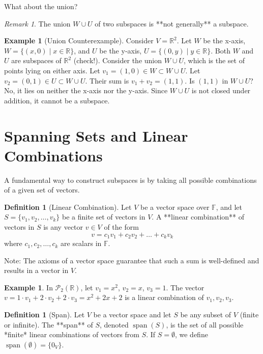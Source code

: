 \documentclass[11pt]{article}
\theoremstyle{definition}
\newtheorem{definition}[theorem]{Definition}
\newtheorem{example}[theorem]{Example}
\theoremstyle{remark}
\newtheorem{remark}[theorem]{Remark}
\newcommand{\R}{\mathbb{R}}
\newcommand{\F}{\mathbb{F}} %
\newcommand{\PolyN}[2]{\mathcal{P}_{#1}(#2)}
\DeclareMathOperator{\Span}{span}
\begin{document}
What about the union?
\begin{remark}
The union $W \cup U$ of two subspaces is **not generally** a subspace.
\end{remark}

\begin{example}[Union Counterexample]
Consider $V = \R^2$. Let $W$ be the x-axis, $W = \{(x, 0) \mid x \in \R\}$, and $U$ be the y-axis, $U = \{(0, y) \mid y \in \R\}$. Both $W$ and $U$ are subspaces of $\R^2$ (check!).
Consider the union $W \cup U$, which is the set of points lying on either axis.
Let $v_1 = (1, 0) \in W \subset W \cup U$.
Let $v_2 = (0, 1) \in U \subset W \cup U$.
Their sum is $v_1 + v_2 = (1, 1)$.
Is $(1, 1)$ in $W \cup U$? No, it lies on neither the x-axis nor the y-axis.
Since $W \cup U$ is not closed under addition, it cannot be a subspace.
\end{example}

\section{Spanning Sets and Linear Combinations}

A fundamental way to construct subspaces is by taking all possible combinations of a given set of vectors.

\begin{definition}[Linear Combination]
Let $V$ be a vector space over $\F$, and let $S = \{v_1, v_2, \dots, v_k\}$ be a finite set of vectors in $V$. A **linear combination** of vectors in $S$ is any vector $v \in V$ of the form
\[ v = c_1 v_1 + c_2 v_2 + \dots + c_k v_k \]
where $c_1, c_2, \dots, c_k$ are scalars in $\F$.
\end{definition}
Note: The axioms of a vector space guarantee that such a sum is well-defined and results in a vector in $V$.

\begin{example}
In $\PolyN{2}{\R}$, let $v_1 = x^2$, $v_2 = x$, $v_3 = 1$. The vector $v = 1 \cdot v_1 + 2 \cdot v_2 + 2 \cdot v_3 = x^2 + 2x + 2$ is a linear combination of $v_1, v_2, v_3$.
\end{example}

\begin{definition}[Span]
Let $V$ be a vector space and let $S$ be any subset of $V$ (finite or infinite). The **span** of $S$, denoted $\Span(S)$, is the set of all possible *finite* linear combinations of vectors from $S$.
If $S = \emptyset$, we define $\Span(\emptyset) = \{0_V\}$.
\end{definition}
\end{document}

